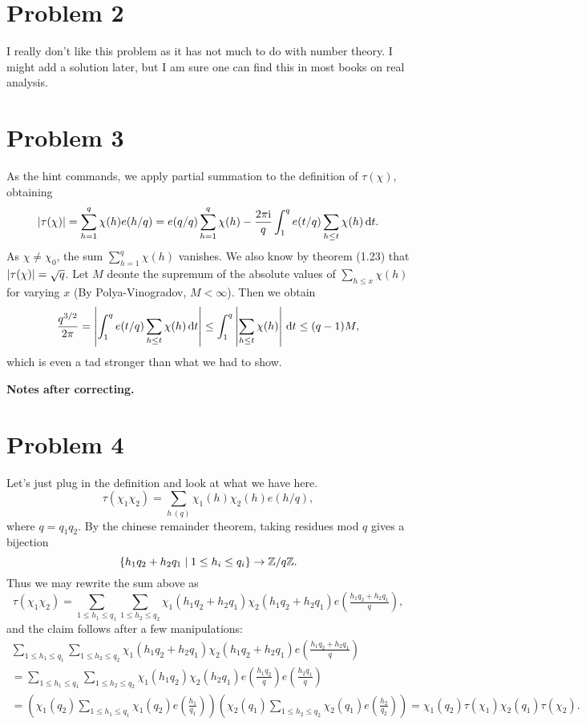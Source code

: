 \documentclass[a4paper,11pt]{article}
\begin{document}
\section*{Problem 2}
I really don't like this problem as it has not much to do with number theory. 
I might add a solution later, but I am sure one can find this in most books on 
real analysis.

\section*{Problem 3}
As the hint commands, we apply partial summation to the definition of
$\tau(\chi)$, obtaining
\[
    \left\lvert \tau(\chi) \right\rvert = \sum_{h=1}^q \chi(h) e(h/q) = e(q/q) \sum_{h=1}^q
    \chi(h) - \frac{2\pi \mathrm i}{q} \int_1^q e(t/q) \sum_{h \leq t} \chi(h) 
    \mathrm{\,d} t.
\]
As $\chi \neq \chi_0$, the sum $\sum_{h=1}^q \chi(h)$ vanishes. We also
know by theorem (1.23) that $\left\lvert \tau(\chi) \right\rvert = \sqrt q$. 
Let $M$ deonte the supremum of the absolute values of $\sum_{h \leq x}
\chi(h)$ for varying $x$ (By Polya-Vinogradov, $M < \infty$). Then we obtain
\[
    \frac{q^{3/2}}{2 \pi} = \left\lvert \int_1^q e(t/q) \sum_{h \leq t} \chi(h) \mathrm{\,d} t \right\rvert \leq \int_1^q \left\lvert  \sum_{h \leq t}  \chi(h)  \right\rvert \mathrm{\,d} t \leq (q-1)M,
\]
which is even a tad stronger than what we had to show. 

\textbf{Notes after correcting.} \leavevmode

\section*{Problem 4}
Let's just plug in the definition and look at what we have here.
\[
    \tau(\chi_1 \chi_2) = \sum_{h \ (q)} \chi_1(h) \chi_2(h) e(h/q),
\]
where $q = q_1 q_2$. By the chinese remainder theorem, taking residues mod $q$ gives
a bijection
\[
    \{h_1 q_2 + h_2 q_1 \mid 1 \leq h_i \leq q_i\} \to \mathbb{Z}/q\mathbb{Z}.
\]
Thus we may rewrite the sum above as 
\[
    \tau(\chi_1 \chi_2) = \sum_{1 \leq h_1 \leq q_1} \sum_{1 \leq h_2 \leq q_2}\chi_1(h_1q_2 + h_2q_1) \chi_2(h_1q_2 + h_2 q_1) e(\tfrac{h_1q_2+h_2q_1}q),
\]
and the claim follows after a few manipulations:
\begin{multline*}
     \sum_{1 \leq h_1 \leq q_1} \sum_{1 \leq h_2 \leq q_2}\chi_1(h_1q_2 + h_2q_1) \chi_2(h_1q_2
     + h_2 q_1) e(\tfrac{h_1q_2+h_2q_1}q) \\
     = \sum_{1 \leq h_1 \leq q_1} \sum_{1 \leq h_2 \leq q_2}\chi_1(h_1q_2) \chi_2(h_2 q_1)
     e(\tfrac{h_1q_2}q) e(\tfrac{h_2q_1}q) \\ 
     = \left(\chi_1(q_2)\sum_{1 \leq h_1 \leq q_1}
     \chi_1(q_2)e(\tfrac{h_1}{q_1})\right) \left(\chi_2(q_1)\sum_{1 \leq h_2 \leq q_2}
     \chi_2(q_1)e(\tfrac{h_2}{q_2})\right) = \chi_1(q_2)\tau(\chi_1) \chi_2(q_1)\tau(\chi_2).
\end{multline*}
\end{document}
